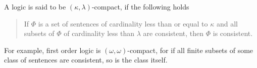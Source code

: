 \documentclass[12pt]{article}
\begin{document}
A logic is said to be $(\kappa,\lambda)$-compact, if the following holds

\begin{quote}
If $\Phi$ is a set of sentences of cardinality less than or equal to $\kappa$ and all subsets of $\Phi$ of cardinality less than $\lambda$ are consistent, then $\Phi$ is consistent.
\end{quote}

For example, first order logic is $(\omega,\omega)$-compact, for if all finite subsets of some class of sentences are consistent, so is the class itself.
\end{document}
